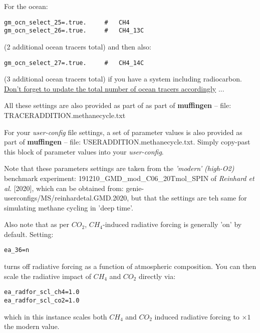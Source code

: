 \documentclass[11pt,fleqn]{book} %
\begin{document}
\vspace{1mm}
\noindent For the ocean:
\small\vspace{-2pt}\begin{verbatim}
gm_ocn_select_25=.true.     #   CH4
gm_ocn_select_26=.true.     #   CH4_13C
\end{verbatim}\vspace{-2pt}\normalsize
(2 additional ocean tracers total) and then also:
\small\vspace{-2pt}\begin{verbatim}
gm_ocn_select_27=.true.     #   CH4_14C
\end{verbatim}\vspace{-2pt}\normalsize
(3 additional ocean tracers total) if you have a system including radiocarbon.
\\\uline{Don't forget to update the total number of ocean tracers accordingly} ...

\vspace{1mm}
\noindent All these settings are also provided as part of as part of \textbf{muffingen} -- file: \\\textsf{\footnotesize TRACERADDITION.methanecycle.txt}

\vspace{1mm}
\noindent For your \textit{user-config} file settings, a set of parameter values is also provided as part of \textbf{muffingen} -- file: \textsf{\footnotesize USERADDITION.methanecycle.txt}. Simply copy-past this block of parameter values into your \textit{user-config}.

\vspace{1mm}
Note that these parameters settings are taken from the \textit{'modern' (high-O2)} benchmark experiment: \textsf{\footnotesize 191210\_GMD\_mod\_C06\_20Tmol\_SPIN} of \textit{Reinhard et al.} [2020], which can be obtained from: \textsf{\footnotesize genie-userconfigs/MS/reinhardetal.GMD.2020}, but that the settings are teh same for simulating methane cycling in 'deep time'.

\vspace{1mm}
Also note that as per \(CO_{2}\), \(CH_{4}\)-induced radiative forcing is generally 'on' by default. Setting:
\small\vspace{-2pt}\begin{verbatim}
ea_36=n
\end{verbatim}\vspace{-2pt}\normalsize
turns off radiative forcing as a function of atmospheric composition. You can then scale the radiative impact of \(CH_{4}\) and \(CO_{2}\) directly via:
\small\vspace{-2pt}\begin{verbatim}
ea_radfor_scl_ch4=1.0
ea_radfor_scl_co2=1.0
\end{verbatim}\vspace{-2pt}\normalsize
which in this instance scales both \(CH_{4}\) and \(CO_{2}\) induced radiative
forcing to \(\times1\) the modern value.
\end{document}
